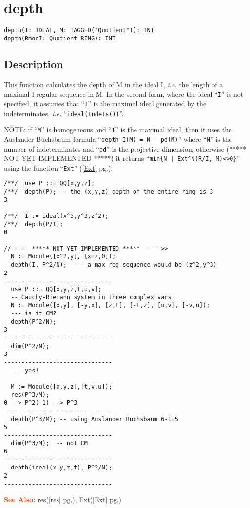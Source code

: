 \documentclass[a4paper]{mybook}
\newenvironment{command}{}{} %
\newcommand\SeeAlso{\par\textcolor{OrangeRed}{\textbf{\large See Also: }}}
\begin{document}
\section{depth}
\label{depth}
\begin{command} %


\begin{Verbatim}[label=syntax, rulecolor=\color{MidnightBlue},
frame=single]
depth(I: IDEAL, M: TAGGED("Quotient")): INT
depth(RmodI: Quotient RING): INT
\end{Verbatim}


\subsection*{Description}

This function calculates the depth of M in the ideal I, \textit{i.e.} the
length of a maximal I-regular sequence in M.  In the second form,
where the ideal ``\verb&I&'' is not specified, it assumes that ``\verb&I&'' is the maximal ideal
generated by the indeterminates, \textit{i.e.} ``\verb&ideal(Indets())&''.
\par 
NOTE: if ``\verb&M&'' is homogeneous and ``\verb&I&'' is the maximal ideal, then it uses
the Auslander-Buchsbaum formula ``\verb&depth_I(M) = N - pd(M)&''
where ``\verb&N&'' is the number of indeterminates and ``\verb&pd&'' is the projective
dimension, otherwise (***** NOT YET IMPLEMENTED *****) it
returns ``\verb&min{N | Ext^N(R/I, M)<>0}&''
using the function ``\verb&Ext&'' (\ref{Ext} pg.\pageref{Ext}).
\begin{Verbatim}[label=example, rulecolor=\color{PineGreen}, frame=single]
/**/  use P ::= QQ[x,y,z];
/**/  depth(P); -- the (x,y,z)-depth of the entire ring is 3
3

/**/  I := ideal(x^5,y^3,z^2);
/**/  depth(P/I);
0

//----- ***** NOT YET IMPLEMENTED ***** ----->>
  N := Module([x^2,y], [x+z,0]);
  depth(I, P^2/N);  --- a max reg sequence would be (z^2,y^3)
2
-------------------------------
  use P ::= QQ[x,y,z,t,u,v];
  -- Cauchy-Riemann system in three complex vars!
  N := Module([x,y], [-y,x], [z,t], [-t,z], [u,v], [-v,u]);
  --- is it CM?
  depth(P^2/N);
3
-------------------------------
  dim(P^2/N);
3
-------------------------------
  --- yes!

  M := Module([x,y,z],[t,v,u]);
  res(P^3/M);
0 --> P^2(-1) --> P^3
-------------------------------
  depth(P^3/M); -- using Auslander Buchsbaum 6-1=5
5
-------------------------------
  dim(P^3/M);  -- not CM
6
-------------------------------
  depth(ideal(x,y,z,t), P^2/N);
2
-------------------------------
\end{Verbatim}


\SeeAlso %
  res(\ref{res} pg.\pageref{res}), 
    Ext(\ref{Ext} pg.\pageref{Ext})
\end{command} %
\end{document}
